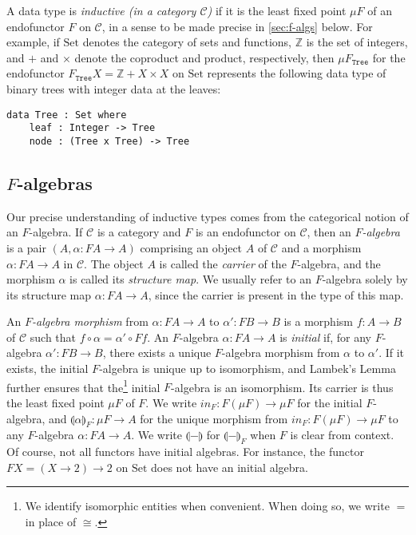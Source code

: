 \documentclass{LMCS}
\newcommand{\tyname}[1]{\texttt{#1}}
\newcommand{\inn}{\mathit{in}}
\newcommand{\cat}[1]{\mathcal{#1}}
\newcommand{\fold}[1]{\llparenthesis #1 \rrparenthesis}
\newcommand{\Set}{\mathrm{Set}}
\begin{document}
A data type is {\em inductive (in a category $\cat{C}$)} if it is the
least fixed point $\mu F$ of an endofunctor $F$ on $\cat{C}$, in a
sense to be made precise in \autoref{sec:f-algs} below. For example,
if $\Set$ denotes the category of sets and functions, $\mathbb{Z}$ is
the set of integers, and $+$ and $\times$ denote the coproduct and
product, respectively, then $\mu F_{\tyname{Tree}}$ for the
endofunctor $F_{\tyname{Tree}}X = \mathbb{Z} + X \times X$ on $\Set$
represents the following data type of binary trees with integer data
at the leaves:
\begin{verbatim}
data Tree : Set where
    leaf : Integer -> Tree
    node : (Tree x Tree) -> Tree
\end{verbatim}

\subsection{$F$-algebras}\label{sec:f-algs}

Our precise understanding of inductive types comes from the
categorical notion of an $F$-algebra. If $\cat{C}$ is a category and
$F$ is an endofunctor on $\cat{C}$, then an \emph{$F$-algebra} is a
pair $(A, \alpha : FA \to A)$ comprising an object $A$ of $\cat{C}$
and a morphism $\alpha : FA \to A$ in $\cat{C}$. The object $A$ is
called the \emph{carrier} of the $F$-algebra, and the morphism
$\alpha$ is called its \emph{structure map}. We usually refer to an
$F$-algebra solely by its structure map $\alpha : FA \to A$, since the
carrier is present in the type of this map.

An \emph{$F$-algebra morphism} from $\alpha : FA \to A$ to $\alpha' :
FB \to B$ is a morphism $f : A \to B$ of $\cat{C}$ such that $f \circ
\alpha = \alpha' \circ Ff$. An $F$-algebra $\alpha : FA \to A$ is
\emph{initial} if, for any $F$-algebra $\alpha' : FB \to B$, there
exists a unique $F$-algebra morphism from $\alpha$ to $\alpha'$. If it
exists, the initial $F$-algebra is unique up to isomorphism, and
Lambek's Lemma further ensures that the\footnote{We identify
  isomorphic entities when convenient. When doing so, we write $=$ in
  place of $\cong$.}  initial $F$-algebra is an isomorphism. Its
carrier is thus the least fixed point $\mu F$ of $F$. We write $\inn_F
: F(\mu F) \to \mu F$ for the initial $F$-algebra, and
$\fold{\alpha}_F : \mu F \to A$ for the unique morphism from $\inn_F :
F(\mu F) \to \mu F$ to any $F$-algebra $\alpha : FA \to A$. We write
$\fold{-}$ for $\fold{-}_F$ when $F$ is clear from context.  Of
course, not all functors have initial algebras. For instance, the
functor $FX = (X \to 2) \to 2$ on $\Set$ does not have an initial
algebra.
\end{document}
